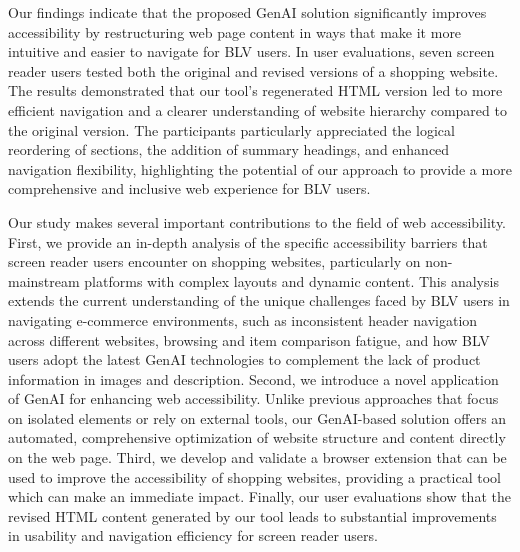 Our findings indicate that the proposed GenAI solution significantly improves accessibility by restructuring web page content in ways that make it more intuitive and easier to navigate for BLV users. In user evaluations, seven screen reader users tested both the original and revised versions of a shopping website. The results demonstrated that our tool's regenerated HTML version led to more efficient navigation and a clearer understanding of website hierarchy compared to the original version. The participants particularly appreciated the logical reordering of sections, the addition of summary headings, and enhanced navigation flexibility, highlighting the potential of our approach to provide a more comprehensive and inclusive web experience for BLV users.

Our study makes several important contributions to the field of web accessibility. First, we provide an in-depth analysis of the specific accessibility barriers that screen reader users encounter on shopping websites, particularly on non-mainstream platforms with complex layouts and dynamic content. This analysis extends the current understanding of the unique challenges faced by BLV users in navigating e-commerce environments, such as inconsistent header navigation across different websites, browsing and item comparison fatigue, and how BLV users adopt the latest GenAI technologies to complement the lack of product information in images and description. Second, we introduce a novel application of GenAI for enhancing web accessibility. Unlike previous approaches that focus on isolated elements or rely on external tools, our GenAI-based solution offers an automated, comprehensive optimization of website structure and content directly on the web page. Third, we develop and validate a browser extension that can be used to improve the accessibility of shopping websites, providing a practical tool which can make an immediate impact. Finally, our user evaluations show that the revised HTML content generated by our tool leads to substantial improvements in usability and navigation efficiency for screen reader users.

